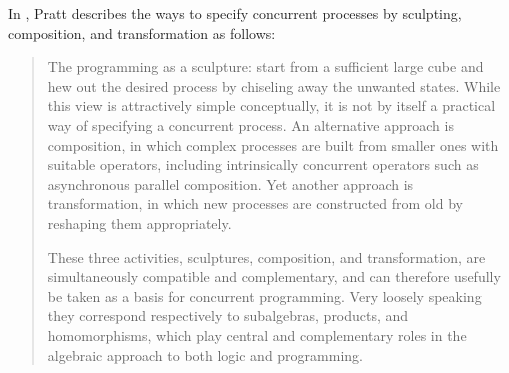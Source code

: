     In \cite{Pratt00Sculptures}, Pratt describes the ways to specify concurrent processes by sculpting, composition, and transformation as follows:
    
    \begin{quote}
        The programming as a sculpture: start from a sufficient large cube and hew out the desired process by chiseling away the unwanted states.
        While this view is attractively simple conceptually, it is not by itself a practical way of specifying a concurrent process. An alternative approach is composition, in which complex processes are built from smaller ones with suitable operators, including intrinsically concurrent operators such as asynchronous parallel composition. Yet another approach is transformation, in which new processes are constructed from old by reshaping them appropriately.
    
        These three activities, sculptures, composition, and transformation, are simultaneously compatible and complementary, and can therefore usefully be taken as a basis for concurrent programming. Very loosely speaking they correspond respectively to subalgebras, products, and homomorphisms, which play central and complementary roles in the algebraic approach to both logic and programming.
    \end{quote}